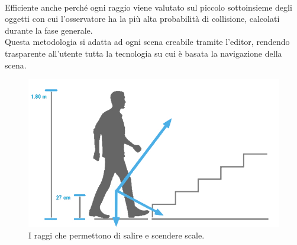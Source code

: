 \\
Efficiente anche perché ogni raggio viene valutato sul piccolo sottoinsieme degli oggetti con cui l’osservatore ha la più alta probabilità di collisione, calcolati durante la fase generale.
\\
Questa metodologia si adatta ad ogni scena creabile tramite l’editor, rendendo trasparente all’utente tutta la tecnologia su cui è basata la navigazione della scena.
\begin{figure}[htb]
 \centering
 \includegraphics[width=0.9\linewidth]{images/chapter_navigazione_scena/collision_gradini.jpg}\hfill
 \caption[I raggi che permetto di salire.]{I raggi che permettono di salire e scendere scale.}
 \label{fig:navigazione_scena_collision_gradini}
\end{figure}
